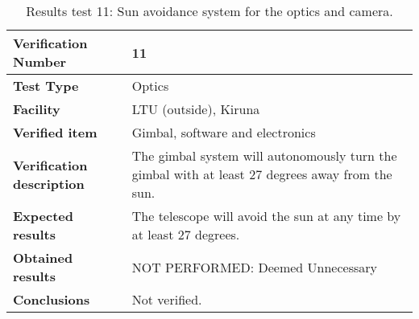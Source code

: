 \begin{table}[H]
\centering

\begin{tabular}{|m{}| m{} |}
\hline
\textbf{Verification Number} 		& 11 					\\ \hline
\textbf{Test Type} 					& Optics				\\ \hline
\textbf{Facility} 					& LTU (outside), Kiruna \\ \hline
\textbf{Verified item} 				& Gimbal, software and electronics \\ \hline

\textbf{Verification description} 	& The gimbal system will autonomously turn the gimbal with at least 27 degrees away from the sun. \\ \hline

\textbf{Expected results} 			& The telescope will avoid the sun at any time by at least 27 degrees. \\ \hline

\textbf{Obtained results} 			& NOT PERFORMED: Deemed Unnecessary\\ \hline

\textbf{Conclusions} 				& Not verified.		\\ \hline
\end{tabular}
\caption{Results test 11: Sun avoidance system for the optics and camera.}
\label{tab:testresult11:sun}
\end{table}


\raggedbottom
